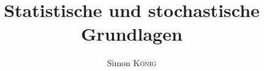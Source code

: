 \documentclass[purple]{../LaTeX-Templates/Skript/skript}
\author{Simon \textsc{König}}
\title{Statistische und stochastische Grundlagen \\\subtitleformat{Vorlesungsmitschrieb zum Modul an der Universität Stuttgart}}
\begin{document}
\maketitle

\tableofcontents





\nocite{*}
\end{document}
